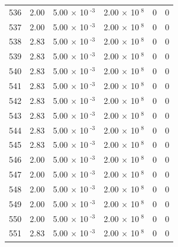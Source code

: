 \documentclass[a4paper,11pt]{article}
\begin{document}
\begin{center}
\begin{longtable}{|R{1.5cm}|R{2.4cm}|R{2.4cm}|R{2.4cm}|R{2.4cm}|R{2.4cm}|}
  536 &   2.00  &         5.00 $\times$ 10$^{\text{          -3}}$  &         2.00 $\times$ 10$^{\text{           8}}$  & 0  & 0 \\
  537 &   2.00  &         5.00 $\times$ 10$^{\text{          -3}}$  &         2.00 $\times$ 10$^{\text{           8}}$  & 0  & 0 \\
  538 &   2.83  &         5.00 $\times$ 10$^{\text{          -3}}$  &         2.00 $\times$ 10$^{\text{           8}}$  & 0  & 0 \\
  539 &   2.83  &         5.00 $\times$ 10$^{\text{          -3}}$  &         2.00 $\times$ 10$^{\text{           8}}$  & 0  & 0 \\
  540 &   2.83  &         5.00 $\times$ 10$^{\text{          -3}}$  &         2.00 $\times$ 10$^{\text{           8}}$  & 0  & 0 \\
  541 &   2.83  &         5.00 $\times$ 10$^{\text{          -3}}$  &         2.00 $\times$ 10$^{\text{           8}}$  & 0  & 0 \\
  542 &   2.83  &         5.00 $\times$ 10$^{\text{          -3}}$  &         2.00 $\times$ 10$^{\text{           8}}$  & 0  & 0 \\
  543 &   2.83  &         5.00 $\times$ 10$^{\text{          -3}}$  &         2.00 $\times$ 10$^{\text{           8}}$  & 0  & 0 \\
  544 &   2.83  &         5.00 $\times$ 10$^{\text{          -3}}$  &         2.00 $\times$ 10$^{\text{           8}}$  & 0  & 0 \\
  545 &   2.83  &         5.00 $\times$ 10$^{\text{          -3}}$  &         2.00 $\times$ 10$^{\text{           8}}$  & 0  & 0 \\
  546 &   2.00  &         5.00 $\times$ 10$^{\text{          -3}}$  &         2.00 $\times$ 10$^{\text{           8}}$  & 0  & 0 \\
  547 &   2.00  &         5.00 $\times$ 10$^{\text{          -3}}$  &         2.00 $\times$ 10$^{\text{           8}}$  & 0  & 0 \\
  548 &   2.00  &         5.00 $\times$ 10$^{\text{          -3}}$  &         2.00 $\times$ 10$^{\text{           8}}$  & 0  & 0 \\
  549 &   2.00  &         5.00 $\times$ 10$^{\text{          -3}}$  &         2.00 $\times$ 10$^{\text{           8}}$  & 0  & 0 \\
  550 &   2.00  &         5.00 $\times$ 10$^{\text{          -3}}$  &         2.00 $\times$ 10$^{\text{           8}}$  & 0  & 0 \\
  551 &   2.83  &         5.00 $\times$ 10$^{\text{          -3}}$  &         2.00 $\times$ 10$^{\text{           8}}$  & 0  & 0 \\

\end{longtable}
\end{center}
\end{document}
